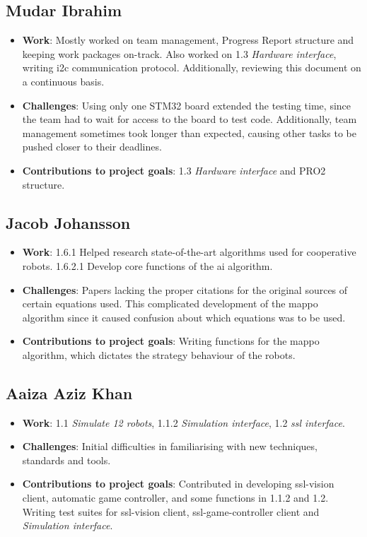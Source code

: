 \subsection*{Mudar Ibrahim}
\begin{itemize}
    \item \textbf{Work}: Mostly worked on team management, Progress Report structure and keeping work packages on-track. Also worked on 1.3 \textit{Hardware interface}, writing \ac{i2c} communication protocol. Additionally, reviewing this document on a continuous basis. 
    \item \textbf{Challenges}: Using only one STM32 board extended the testing time, since the team had to wait for access to the board to test code.
    Additionally, team management sometimes took longer than expected, causing other tasks to be pushed closer to their deadlines.
    \item \textbf{Contributions to project goals}: 1.3 \textit{Hardware interface} and PRO2 structure. 
\end{itemize}
\subsection*{Jacob Johansson}
\begin{itemize}
    \item \textbf{Work}: 1.6.1 Helped research state-of-the-art algorithms used for cooperative robots. 1.6.2.1 Develop core functions of the \ac{ai} algorithm.
    \item \textbf{Challenges}: Papers lacking the proper citations for the original sources of certain equations used. This complicated development of the \ac{mappo} algorithm since it caused confusion about which equations was to be used.
    \item \textbf{Contributions to project goals}: Writing functions for the \acf{mappo} algorithm, which dictates the strategy behaviour of the robots.
\end{itemize}
\subsection*{Aaiza Aziz Khan}
\begin{itemize}
    \item \textbf{Work}: 1.1 \textit{Simulate 12 robots}, 1.1.2 \textit{Simulation interface}, 1.2 \textit{\acs{ssl} interface}.
    \item \textbf{Challenges}: Initial difficulties in familiarising with new techniques, standards and tools.
    \item \textbf{Contributions to project goals}: Contributed in developing ssl-vision client, automatic game controller, and some functions in 1.1.2 and 1.2. Writing test suites for ssl-vision client, ssl-game-controller client and \textit{Simulation interface}.
\end{itemize}

